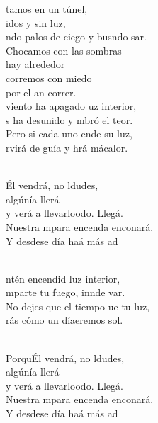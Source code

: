 \documentclass[12pt]{article}
\begin{document}
\begin{multicols*}{2}
\begin{cancion}%
	tamos en un túnel, \\
	idos y sin luz,\\
	ndo palos de ciego y busndo sar.\\
Chocamos con las sombras \\
	hay alrededor\\
	corremos con miedo \\
	por el an correr.\\
\jump
	 viento ha apagado uz interior,\\
	s ha desunido y mbró el teor.\\
	Pero si cada uno ende su luz,\\
	rvirá de guía y hrá mácalor.\\\jump\\
	\begin{chorus}%
	Él vendrá, no ldudes, \\
	algúnía llerá\\
	y verá a llevarloodo. Llegá. \\
	Nuestra mpara encenda enconará. \\
	Y desdese día haá más ad\\
	\end{chorus}%
	\jump\\
	ntén encendid luz interior,\\
	mparte tu fuego, innde var.\\
	No dejes que el tiempo ue tu luz,\\
	rás cómo un díaeremos  sol.\\\jump\\
	\begin{chorus}%
	PorquÉl vendrá, no ldudes, \\
	algúnía llerá\\
	y verá a llevarloodo. Llegá. \\
	Nuestra mpara encenda enconará. \\
	Y desdese día haá más ad\\
	\end{chorus}%
	\jump\\
\end{cancion}%


\end{multicols*}
\end{document}
